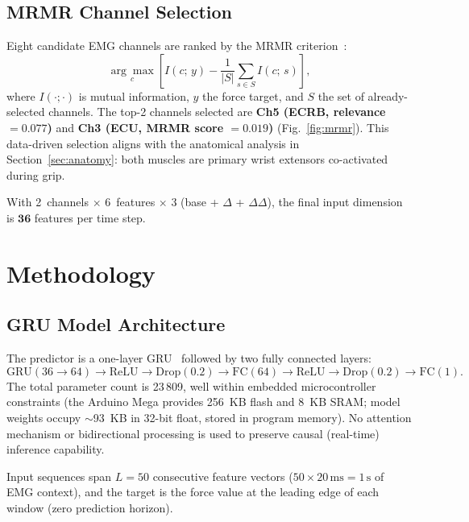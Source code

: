 \documentclass[journal]{IEEEtran}
\begin{document}
\subsection{MRMR Channel Selection}
\label{subsec:mrmr}

Eight candidate EMG channels are ranked by the MRMR
criterion~\cite{peng2005feature}:
\begin{equation}
  \underset{c}{\arg\max}\left[I(c;\,y) - \frac{1}{|S|}\sum_{s\in S}I(c;\,s)\right],
\end{equation}
where $I(\cdot;\cdot)$ is mutual information, $y$ the force target, and
$S$ the set of already-selected channels.  The top-2 channels selected are
\textbf{Ch5 (ECRB, relevance $= 0.077$)} and \textbf{Ch3 (ECU, MRMR score
$= 0.019$)} (Fig.~\ref{fig:mrmr}).  This data-driven selection aligns with
the anatomical analysis in Section~\ref{sec:anatomy}: both muscles are
primary wrist extensors co-activated during grip.

With 2~channels $\times$ 6~features $\times$ 3 (base + $\Delta$ +
$\Delta\Delta$), the final input dimension is $\mathbf{36}$ features
per time step.

\section{Methodology}
\label{sec:method}

\subsection{GRU Model Architecture}

The predictor is a one-layer GRU~\cite{cho2014learning} followed by two
fully connected layers:
\begin{equation}
\text{GRU}(36 \to 64) \to \text{ReLU} \to \text{Drop}(0.2)
\to \text{FC}(64) \to \text{ReLU} \to \text{Drop}(0.2)
\to \text{FC}(1).
\end{equation}
The total parameter count is 23\,809, well within embedded microcontroller
constraints (the Arduino Mega provides 256~KB flash and 8~KB SRAM; model
weights occupy $\sim$93~KB in 32-bit float, stored in program memory).  No
attention mechanism or bidirectional processing is used to preserve causal
(real-time) inference capability.

Input sequences span $L = 50$ consecutive feature vectors
($50 \times 20\,\text{ms} = 1\,\text{s}$ of EMG context), and the target
is the force value at the leading edge of each window (zero prediction
horizon).
\end{document}
